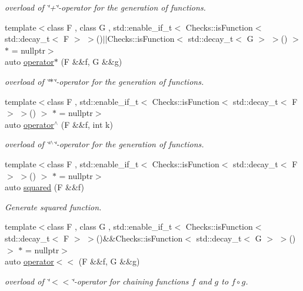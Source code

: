 \begin{DoxyCompactItemize}
\begin{DoxyCompactList}\small\item\em overload of \char`\"{}+\char`\"{}-\/operator for the generation of functions. \end{DoxyCompactList}\item 
{\footnotesize template$<$class F , class G , std\+::enable\+\_\+if\+\_\+t$<$ Checks\+::is\+Function$<$ std\+::decay\+\_\+t$<$ F $>$ $>$()$\vert$$\vert$\+Checks\+::is\+Function$<$ std\+::decay\+\_\+t$<$ G $>$ $>$() $>$ $\ast$  = nullptr$>$ }\\auto \hyperlink{namespaceFunG_a267562e725c73ece1c1d057b5f29511f}{operator$\ast$} (F \&\&f, G \&\&g)
\begin{DoxyCompactList}\small\item\em overload of \char`\"{}$\ast$\char`\"{}-\/operator for the generation of functions. \end{DoxyCompactList}\item 
{\footnotesize template$<$class F , std\+::enable\+\_\+if\+\_\+t$<$ Checks\+::is\+Function$<$ std\+::decay\+\_\+t$<$ F $>$ $>$() $>$ $\ast$  = nullptr$>$ }\\auto \hyperlink{namespaceFunG_a94273e3ea80324e591bb98ae3c051221}{operator$^\wedge$} (F \&\&f, int k)
\begin{DoxyCompactList}\small\item\em overload of \char`\"{}$^\wedge$\char`\"{}-\/operator for the generation of functions. \end{DoxyCompactList}\item 
{\footnotesize template$<$class F , std\+::enable\+\_\+if\+\_\+t$<$ Checks\+::is\+Function$<$ std\+::decay\+\_\+t$<$ F $>$ $>$() $>$ $\ast$  = nullptr$>$ }\\auto \hyperlink{namespaceFunG_ac4ffc0754104af6ddf114e154251db78}{squared} (F \&\&f)
\begin{DoxyCompactList}\small\item\em Generate squared function. \end{DoxyCompactList}\item 
{\footnotesize template$<$class F , class G , std\+::enable\+\_\+if\+\_\+t$<$ Checks\+::is\+Function$<$ std\+::decay\+\_\+t$<$ F $>$ $>$()\&\&\+Checks\+::is\+Function$<$ std\+::decay\+\_\+t$<$ G $>$ $>$() $>$ $\ast$  = nullptr$>$ }\\auto \hyperlink{namespaceFunG_a65436d4494e99629b0177d0df7634a6b}{operator$<$$<$} (F \&\&f, G \&\&g)
\begin{DoxyCompactList}\small\item\em overload of \char`\"{}$<$$<$\char`\"{}-\/operator for chaining functions $f$ and $g$ to $ f \circ g $. \end{DoxyCompactList}\item 

\end{DoxyCompactItemize}
